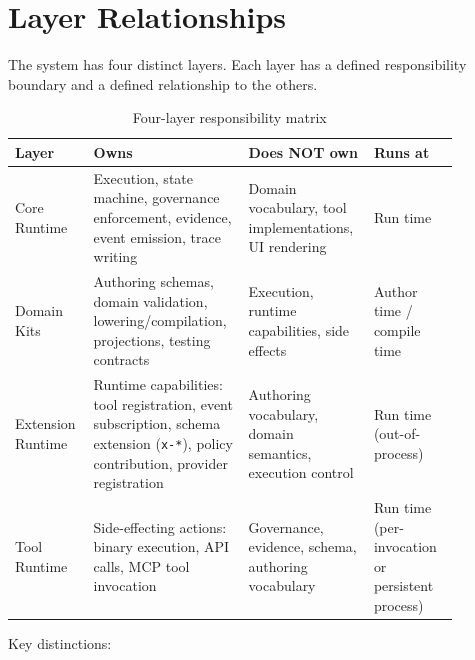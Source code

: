 \section{Layer Relationships}
\label{sec:kit-layers}

The system has four distinct layers.  Each layer has a defined
responsibility boundary and a defined relationship to the others.

\begin{table}[ht]
\centering
\caption{Four-layer responsibility matrix}
\label{tab:kit-layers}
\small
\begin{tabular}{p{0.15\linewidth}p{0.30\linewidth}p{0.25\linewidth}p{0.18\linewidth}}
\toprule
\textbf{Layer} & \textbf{Owns} & \textbf{Does NOT own} & \textbf{Runs at} \\
\midrule
Core Runtime &
  Execution, state machine, governance enforcement, evidence, event emission, trace writing &
  Domain vocabulary, tool implementations, UI rendering &
  Run time \\
\midrule
Domain Kits &
  Authoring schemas, domain validation, lowering/compilation, projections, testing contracts &
  Execution, runtime capabilities, side effects &
  Author time / compile time \\
\midrule
Extension Runtime &
  Runtime capabilities: tool registration, event subscription, schema extension (\texttt{x-*}), policy contribution, provider registration &
  Authoring vocabulary, domain semantics, execution control &
  Run time (out-of-process) \\
\midrule
Tool Runtime &
  Side-effecting actions: binary execution, API calls, MCP tool invocation &
  Governance, evidence, schema, authoring vocabulary &
  Run time (per-invocation or persistent process) \\
\bottomrule
\end{tabular}
\end{table}

Key distinctions:

